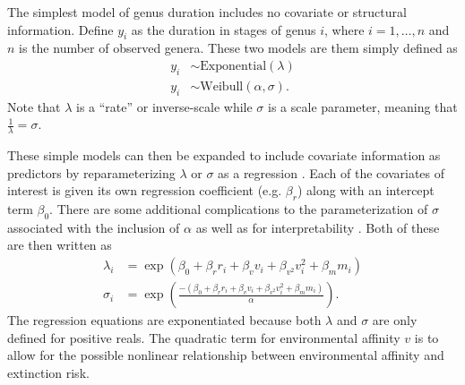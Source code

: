 \documentclass[12pt,letterpaper]{article}
\begin{document}
The simplest model of genus duration includes no covariate or structural information. Define \(y_{i}\) as the duration in stages of genus \(i\), where \(i = 1, \dots, n\) and \(n\) is the number of observed genera. These two models are them simply defined as
\begin{equation}
  \begin{aligned}
    y_{i} &\sim \mathrm{Exponential}(\lambda) \\
    y_{i} &\sim \mathrm{Weibull}(\alpha, \sigma).
  \end{aligned}
  \label{eq:simple}
\end{equation}
Note that \(\lambda\) is a ``rate'' or inverse-scale while \(\sigma\) is a scale parameter, meaning that \(\frac{1}{\lambda} = \sigma\).

These simple models can then be expanded to include covariate information as predictors by reparameterizing \(\lambda\) or \(\sigma\) as a regression \citep{Klein2003}. Each of the covariates of interest is given its own regression coefficient (e.g. \(\beta_{r}\)) along with an intercept term \(\beta_{0}\). There are some additional complications to the parameterization of \(\sigma\) associated with the inclusion of \(\alpha\) as well as for interpretability \citep{Klein2003}. Both of these are then written as
\begin{equation}
  \begin{aligned}
    \lambda_{i} &= \exp(\beta_{0} + \beta_{r} r_{i} + \beta_{v} v_{i} + \beta_{v^{2}} v_{i}^{2} + \beta_{m} m_{i}) \\
    \sigma_{i} &= \exp\left(\frac{-(\beta_{0} + \beta_{r} r_{i} + \beta_{v} v_{i} + \beta_{v^{2}} v_{i}^{2} + \beta_{m} m_{i})}{\alpha}\right).
  \end{aligned}
  \label{eq:regression}
\end{equation}
The regression equations are exponentiated because both \(\lambda\) and \(\sigma\) are only defined for positive reals. The quadratic term for environmental affinity \(v\) is to allow for the possible nonlinear relationship between environmental affinity and extinction risk.
\end{document}
